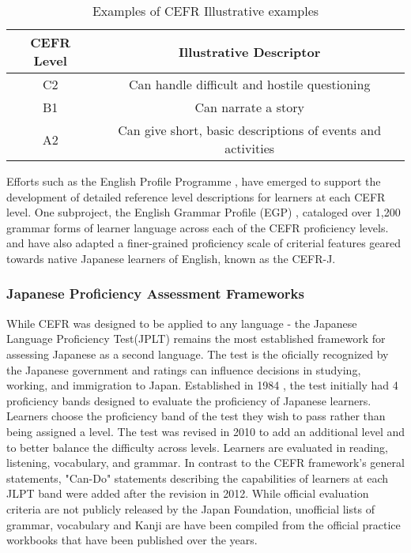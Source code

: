 \begin{table}
\centering
\begin{tabular}{cc}
\hline \textbf{CEFR Level} & \textbf{Illustrative Descriptor} \\ \hline
C2 & Can handle difficult and hostile questioning \\
B1  & Can narrate a story \\
A2 & Can give short, basic descriptions of events and activities \\
\hline
\end{tabular}
\caption{\label{tab:cefr-descriptors} Examples of CEFR Illustrative examples}
\end{table}

Efforts such
as the English Profile Programme \citep{Saville2010}, have emerged to support the development of detailed reference
level
descriptions
for learners at each CEFR level. One subproject, the English Grammar Profile (EGP) \citep{okeeffe2017},
cataloged over 1,200 grammar forms of learner language across each of the CEFR proficiency levels.
\citet{tono2018} and \citet{ishii2016} have
also adapted a
finer-grained
proficiency scale
of criterial features
geared
towards native Japanese learners of English, known as the CEFR-J.



\subsubsection{Japanese Proficiency Assessment Frameworks}
While CEFR was designed to be applied to any language - the Japanese Language Proficiency Test(JPLT) remains the
most established framework for assessing Japanese as a second language. The test is the oficially
recognized by the Japanese government and ratings can influence decisions in studying, working, and immigration to
Japan.  
Established in
1984
\citet{JLPTinfo}, the
test initially had 4
proficiency bands
designed to evaluate the proficiency of Japanese learners. Learners choose the proficiency band of the test they
wish to pass rather than being assigned a level. The test was revised in 2010 to add an additional level and to
better balance the difficulty across levels. Learners are evaluated in reading, listening,
vocabulary, and grammar. In contrast to the CEFR framework's general statements,
"Can-Do" statements describing the
capabilities of
learners at
each
JLPT band were added after the revision in 2012. While official evaluation criteria are not publicly released by the
Japan
Foundation,
unofficial lists of grammar, vocabulary and Kanji are have been compiled from the official practice workbooks that
have been published over the years.

